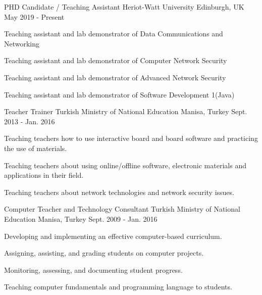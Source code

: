 
\begin{cventries}
  \cventry
    {PHD Candidate / Teaching Assistant} %
    {Heriot-Watt University} %
    {Edinburgh, UK} %
    {May 2019 - Present} %
    {
      \begin{cvitems} %
        \item {Teaching assistant and lab demonstrator of Data Communications and Networking}
		\item {Teaching assistant and lab demonstrator of Computer Network Security}
		 \item {Teaching assistant and lab demonstrator of Advanced Network Security}
		\item {Teaching assistant and lab demonstrator of Software Development 1(Java)}
      \end{cvitems}
    }







  \cventry
    {Teacher Trainer} %
    {Turkish Ministry of National Education} %
    {Manisa, Turkey} %
    {Sept. 2013 - Jan. 2016} %
    {
      \begin{cvitems} %
               \item {Teaching teachers how to use interactive board and board software and practicing the use of materials.}
\item {Teaching teachers about using online/offline software, electronic materials and applications in their field.}
\item {Teaching teachers about network technologies and network security issues.}
      \end{cvitems}
    }





  \cventry
    {Computer Teacher and Technology Consultant} %
    {Turkish Ministry of National Education} %
    {Manisa, Turkey} %
    {Sept. 2009 - Jan. 2016} %
    {
      \begin{cvitems} %
        \item {Developing and implementing an effective computer-based curriculum.}
\item {Assigning, assisting, and grading students on computer projects.}
\item {Monitoring, assessing, and documenting student progress.}
\item {Teaching computer fundamentals and programming language to students.}\end{cvitems}}\end{cventries}
